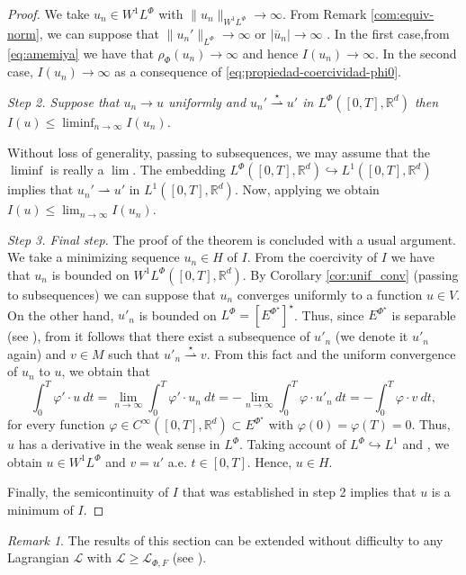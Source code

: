 \documentclass[twoside]{article}
\theoremstyle{remark}
\newtheorem{comentario}{Remark}
\newcommand{\orlnor}{\|_{L^{\Phi}}}
\newcommand{\lphi}{L^{\Phi}}
\newcommand{\wphi}{W^{1}\lphi}
\newcommand{\sobnor}{\|_{W^{1}\lphi}}
\newcommand{\rr}{\mathbb{R}}
\renewcommand{\leq}{\leqslant}
\renewcommand{\geq}{\geqslant}
\newcommand{\epsi}{E^{\Phi^{\star}}}
\begin{document}
\begin{proof}
We take $u_n\in\wphi$ with $\|u_n\sobnor\to\infty$. From Remark \ref{com:equiv-norm}, we can suppose that $\|u_n'\orlnor \to \infty$ or $|\overline{u}_n|\to \infty$ . In the first case,from \eqref{eq:amemiya}  we have  that $\rho_\Phi(u_n)\to\infty$ and hence  $I(u_n)\to\infty$. In the second case,  $I(u_n)\to\infty$ as a consequence of \eqref{eq:propiedad-coercividad-phi0}.





\emph{Step 2. Suppose that $u_n\to u$ uniformly and $u_n'\overset{\star}{\rightharpoonup} u'$ in $\lphi([0,T],\rr^d)$ then
$
I(u)\leq\liminf_{n\to\infty}I(u_n)
$.
}  


  Without loss of generality, passing to subsequences, we may assume that the $\liminf$ is really a $\lim$. The embedding  $\lphi([0,T],\rr^d)\hookrightarrow L^1([0,T],\rr^d)$ implies that  $u_n'\rightharpoonup u' $ in $ L^1([0,T],\rr^d)$.  Now, applying \cite[Thm. 3.6]{buttazzo1998one} we obtain $I(u)\leq \lim_{n\to\infty}I(u_n)$.

\emph{Step 3. Final step.}
The proof of the theorem is concluded with a usual argument. We take a minimizing sequence $u_n \in H$ of $I$. 
From the coercivity of $I$ we have that $u_n$ is bounded on $\wphi([0,T],\rr^d)$. By Corollary \ref{cor:unif_conv}  (passing to subsequences) we can suppose that $u_n$ converges uniformly to a function $u\in V$. 
On the other hand, $u'_n$ is bounded on $\lphi=\left[\epsi\right]^\star$. Thus,  
since $E^{\Phi^{\star}}$ is separable (see \cite[Thm. 6.3]{Orliczvectorial2005}), from \cite[Cor. 3.30]{brezis2010functional} 
it follows that there exist a subsequence of $u'_n$ (we denote it $u'_n$ again) and $v \in M$ such that $u'_n\overset{\star}{\rightharpoonup}v$. From this fact and the uniform convergence of $u_n$ to $u$, we obtain that
\[
\int_0^T\varphi'\cdot u\ dt=\lim_{n\to\infty}\int_0^T\varphi'\cdot u_n \ dt=
-\lim_{n\to\infty}\int_0^T\varphi\cdot u'_n\ dt=-\int_0^T\varphi\cdot v\ dt,
\]
for every function $\varphi\in C^{\infty}([0,T],\rr^d)\subset\epsi$ with $\varphi(0)= \varphi(T)=0$.
Thus, $u$ has a  derivative in the weak sense in $\lphi$. Taking account of 
$\lphi \hookrightarrow L^1$ and \cite[Thms. 2.3 and 2.17 ]{buttazzo1998one}, 
we obtain $u\in \wphi$ and $v=u'$ a.e. $t\in [0,T]$.
Hence, $u \in H$. 

Finally, the semicontinuity of $I$ that was established in step 2  implies that $u$ is a minimum of $I$.
\end{proof}


\begin{comentario} The results of this section can be extended without difficulty to any Lagrangian $\mathcal{L}$ with $\mathcal{L}\geq \mathcal{L}_{\Phi,F}$ (see \cite{ABGMS2015}).
\end{comentario}
\end{document}
